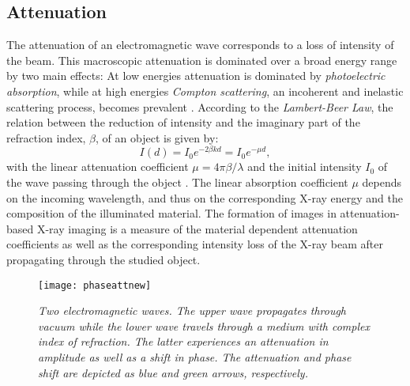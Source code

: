 \subsection{Attenuation}\label{subsec:att}
The attenuation of an electromagnetic wave corresponds to a loss of intensity of the beam. This macroscopic attenuation is dominated over a broad energy range by two main effects: At low energies attenuation is dominated by \textit{photoelectric absorption}, while at high energies \textit{Compton scattering}, an incoherent and inelastic scattering process, becomes prevalent \citep{Als-nielsen}. According to the \textit{Lambert-Beer Law}, the relation between the reduction of intensity and the imaginary part of the refraction index, $\beta$, of an object is given by:
\begin{equation}
I(d) = I_{0}e^{-2\beta kd} = I_{0}e^{-\mu d} ,   
\end{equation}     
with the linear attenuation coefficient $ \mu = 4\pi \beta / \lambda$ and the initial intensity $I_{0}$ of the wave passing through the object \citep{Cremer2013}. The linear absorption coefficient $\mu$ depends on the incoming wavelength, and thus on the corresponding X-ray energy and the composition of the illuminated material. The formation of images in attenuation-based X-ray imaging is a measure of the material dependent attenuation coefficients as well as the corresponding intensity loss of the X-ray beam after propagating through the studied object.
\begin{figure}[h]
	\begin{center}
		\texttt{[image: phaseattnew]}
	\end{center}
	\caption[Attenuation and phase shift of electromagnetic waves]{\textit{Two electromagnetic waves. The upper wave propagates through vacuum while the lower wave travels through a medium with complex index of refraction. The latter experiences an attenuation in amplitude as well as a shift in phase. The attenuation and phase shift are depicted as blue and green arrows, respectively.}}
	\label{phatt}
\end{figure}
